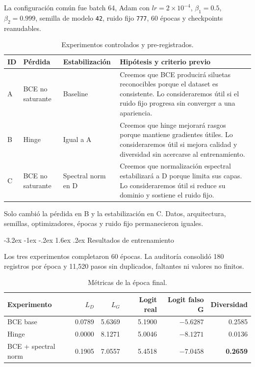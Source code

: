 \documentclass[11pt]{article}
\makeatletter
\renewcommand\section{\@startsection{section}{1}{\z@}%
  {-3.2ex \@plus -1ex \@minus -.2ex}%
  {1.6ex \@plus .2ex}%
  {\normalfont\Large\bfseries\color{DeepPurple}}}
\makeatother
\begin{document}
La configuración común fue batch 64, Adam con $lr=2\times10^{-4}$, $\beta_1=0.5$, $\beta_2=0.999$, semilla de modelo \texttt{42}, ruido fijo \texttt{777}, 60 épocas y checkpoints reanudables.

\begin{table}[H]
\centering
\caption{Experimentos controlados y pre-registrados.}
\begin{tabularx}{\textwidth}{@{}l l l X@{}}
\toprule
ID & Pérdida & Estabilización & Hipótesis y criterio previo \\
\midrule
A & BCE no saturante & Baseline & Creemos que BCE producirá siluetas reconocibles porque el dataset es consistente. Lo consideraremos útil si el ruido fijo progresa sin converger a una apariencia. \\
B & Hinge & Igual a A & Creemos que hinge mejorará rasgos porque mantiene gradientes útiles. Lo consideraremos útil si mejora calidad y diversidad sin acercarse al entrenamiento. \\
C & BCE no saturante & Spectral norm en D & Creemos que normalización espectral estabilizará a D porque limita sus capas. Lo consideraremos útil si reduce su dominio y sostiene el ruido fijo. \\
\bottomrule
\end{tabularx}
\end{table}

Solo cambió la pérdida en B y la estabilización en C. Datos, arquitectura, semillas, optimizadores, épocas y ruido fijo permanecieron iguales.

\section{Resultados de entrenamiento}

Los tres experimentos completaron 60 épocas. La auditoría consolidó 180 registros por época y 11,520 pasos sin duplicados, faltantes ni valores no finitos.

\begin{table}[H]
\centering
\caption{Métricas de la época final.}
\begin{tabular}{@{}lrrrrr@{}}
\toprule
Experimento & $L_D$ & $L_G$ & Logit real & Logit falso G & Diversidad \\
\midrule
BCE base & 0.0789 & 5.6369 & 5.1900 & $-5.6287$ & 0.2585 \\
Hinge & 0.0000 & 8.1271 & 5.0046 & $-8.1271$ & 0.0136 \\
BCE + spectral norm & 0.1905 & 7.0557 & 5.4518 & $-7.0458$ & \textbf{0.2659} \\
\bottomrule
\end{tabular}
\end{table}
\end{document}
